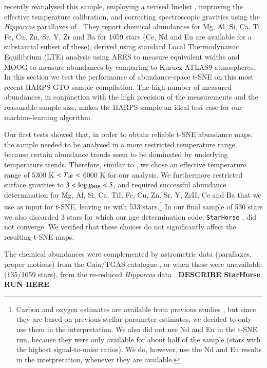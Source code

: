 \documentclass{aa}  %
\begin{document}
\citet{DelgadoMena2017} recently reanalysed this sample, employing a revised linelist \citep{Tsantaki2013}, improving the effective temperature calibration, and correcting spectroscopic gravities using the {\it Hipparcos} parallaxes of \citet{vanLeeuwen2007}. They report chemical abundances for Mg, Al, Si, Ca, Ti, Fe, Cu, Zn, Sr, Y, Zr and Ba for 1059 stars (Ce, Nd and Eu are available for a substantial subset of these), derived using standard Local Thermodynamic Equilibrium (LTE) analysis using ARES to measure equivalent widths and MOOG to measure abundances by comparing to Kurucz ATLAS9 atmospheres. In this section we test the performance of abundance-space t-SNE on this most recent HARPS GTO sample compilation. The high number of measured abundances, in conjunction with the high precision of the measurements and the reasonable sample size, makes the HARPS sample an ideal test case for our machine-learning algorithm.  

Our first tests showed that, in order to obtain reliable t-SNE abundance maps, the sample needed to be analysed in a more restricted temperature range, because certain abundance trends seem to be dominated by underlying temperature trends. Therefore, similar to \citet{DelgadoMena2017}, we chose an effective temperature range of 5300 K $<T_{\rm eff}<$ 6000 K for our analysis. We furthermore restricted surface gravities to $3<\log g_{\rm HIP}<5$, and required successful abundance determination for Mg, Al, Si, Ca, TiI, Fe, Cu, Zn, Sr, Y, ZrII, Ce and Ba that we use as input for t-SNE, leaving us with 533 stars.\footnote{Carbon and oxygen estimates are available from previous studies \citep{Suarez-Andres2017, BertrandeLis2015}, but since they are based on previous stellar parameter estimates, we decided to only use them in the interpretation. We also did not use Nd and Eu in the t-SNE run, because they were only available for about half of the sample (stars with the highest signal-to-noise ratios). We do, however, use the Nd and Eu results in the interpretation, whenever they are available.} In our final sample of 530 stars we also discarded 3 stars for which our age determination code, {\tt StarHorse} \citep{Santiago2016, Queiroz2017}, did not converge. We verified that these choices do not significantly affect the resulting t-SNE maps. 

The chemical abundances were complemented by astrometric data (parallaxes, proper motions) from the Gaia/TGAS catalogue \citet{GaiaCollaboration2016}, or when these were unavailable (135/1059 stars), from the re-reduced {\it Hipparcos} data \citep{vanLeeuwen2007}. {\bf DESCRIBE StarHorse RUN HERE}.
\end{document}
